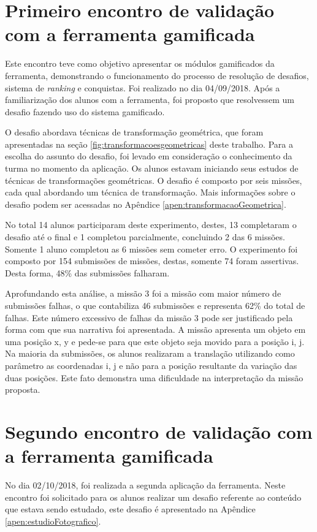 \documentclass[
	12pt,				%
	oneside,			%
	a4paper,			%
	english,			%
	french,				%
	spanish,			%
	brazil,				%
	]{abntex2}
\begin{document}
\section{Primeiro encontro de validação com a ferramenta gamificada}
\label{sec:validacaoPrimeiroEncontro}

Este encontro teve como objetivo apresentar os módulos gamificados da ferramenta, demonstrando o funcionamento do processo de resolução de desafios, sistema de \textit{ranking} e conquistas. Foi realizado no dia 04/09/2018. Após a familiarização dos alunos com a ferramenta, foi proposto que resolvessem um desafio fazendo uso do sistema gamificado.

O desafio abordava técnicas de transformação geométrica, que foram apresentadas na seção \ref{fig:transformacoesgeometricas} deste trabalho. Para a escolha do assunto do desafio, foi levado em consideração o conhecimento da turma no momento da aplicação. Os alunos estavam iniciando seus estudos de técnicas de transformações geométricas. O desafio é composto por seis missões, cada qual abordando um técnica de transformação. Mais informações sobre o desafio podem ser acessadas no Apêndice \ref{apen:transformacaoGeometrica}.

No total 14 alunos participaram deste experimento, destes, 13 completaram o desafio até o final e 1 completou parcialmente, concluindo 2 das 6 missões. Somente 1 aluno completou as 6 missões sem cometer erro. O experimento foi composto por 154 submissões de missões, destas, somente 74 foram assertivas. Desta forma, 48\% das submissões falharam.

Aprofundando esta análise, a missão 3 foi a missão com maior número de submissões falhas, o que contabiliza 46 submissões e representa 62\% do total de falhas. Este número excessivo de falhas da missão 3 pode ser justificado pela forma com que sua narrativa foi apresentada. A missão apresenta um objeto em uma posição x, y e pede-se para que este objeto seja movido para a posição i, j. Na maioria da submissões, os alunos realizaram a translação utilizando como parâmetro as coordenadas i, j e não para a posição resultante da variação das duas posições. Este fato demonstra uma dificuldade na interpretação da missão proposta.

\section{Segundo encontro de validação com a ferramenta gamificada}

No dia 02/10/2018, foi realizada a segunda aplicação da ferramenta. Neste encontro foi solicitado para os alunos realizar um desafio referente ao conteúdo que estava sendo estudado, este desafio é apresentado na Apêndice \ref{apen:estudioFotografico}.
\end{document}
